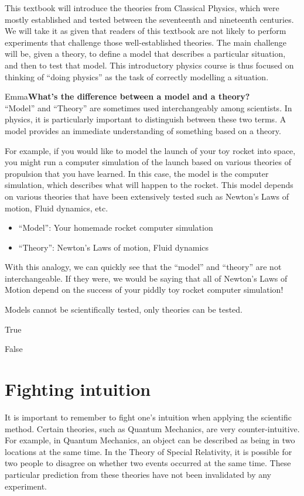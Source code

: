 This textbook will introduce the theories from Classical Physics, which were mostly established and tested between the seventeenth and nineteenth centuries. We will take it as given that readers of this textbook are not likely to perform experiments that challenge those well-established theories. The main challenge will be, given a theory, to define a model that describes a particular situation, and then to test that model. This introductory physics course is thus focused on thinking of ``doing physics'' as the task of correctly modelling a situation.
\newpage
\begin{studentOpinion}{Emma}{\textbf{What's the difference between a model and a theory?}}\\
``Model'' and ``Theory'' are sometimes used interchangeably among scientists. In physics, it is particularly important to distinguish between these two terms. A model provides an immediate understanding of something based on a theory. 

For example, if you would like to model the launch of your toy rocket into space, you might run a computer simulation of the launch based on various theories of propulsion that you have learned. In this case, the model is the computer simulation, which describes what will happen to the rocket. This model depends on various theories that have been extensively tested such as Newton's Laws of motion, Fluid dynamics, etc. 
\begin{itemize}
\item``Model'': Your homemade rocket computer simulation
\item``Theory'': Newton's Laws of motion, Fluid dynamics
\end{itemize}
With this analogy, we can quickly see that the ``model'' and ``theory'' are not interchangeable. If they were, we would be saying that all of Newton's Laws of Motion depend on the success of your piddly toy rocket computer simulation!
\end{studentOpinion}

\begin{checkpoint}
\begin{MCquestion}{Models cannot be scientifically tested, only theories can be tested.}
\item True
\item False \correct
\end{MCquestion}
\end{checkpoint}

\section{Fighting intuition}
It is important to remember to fight one's intuition when applying the scientific method. Certain theories, such as Quantum Mechanics, are very counter-intuitive. For example, in Quantum Mechanics, an object can be described as being in two locations at the same time. In the Theory of Special Relativity, it is possible for two people to disagree on whether two events occurred at the same time. These particular prediction from these theories have not been invalidated by any experiment.


